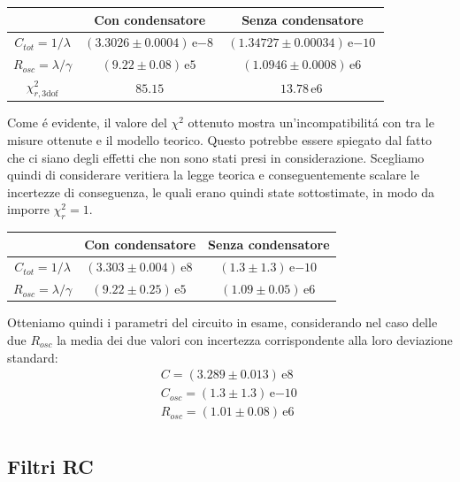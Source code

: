 \documentclass{article}
\newcommand{\E}[1]{\, \mathrm{e}{#1} \, }
\begin{document}
\begin{center}
\begin{tabular}{c | c c} 
& Con condensatore  & Senza condensatore \\
[0.5ex]
\hline
$C_{tot}=1/\lambda$ &$ (3.3026\pm 0.0004)\E{-8} $&$ (1.34727\pm 0.00034)\E{-10} $\\
$R_{osc}=\lambda/\gamma$ &$ (9.22\pm 0.08)\E{5} $&$ (1.0946\pm 0.0008)\E{6} $\\
$\chi^2_{r,\mathrm{3 dof}}$& $85.15$ & $13.78\E{6}$ \\

\end{tabular}
\end{center}

Come \'e evidente, il valore del $\chi^2$ ottenuto mostra un'incompatibilit\'a con tra le misure ottenute e il modello teorico. Questo potrebbe essere spiegato dal fatto che ci siano degli effetti che non sono stati presi in considerazione. Scegliamo quindi di considerare veritiera la legge teorica e conseguentemente scalare le incertezze di conseguenza, le quali erano quindi state sottostimate, in modo da imporre $\chi^2_r=1$.\\

\begin{center}
\begin{tabular}{c | c c} 
& Con condensatore  & Senza condensatore \\
[0.5ex]
\hline
$C_{tot}=1/\lambda$ &$ (3.303\pm 0.004)\E{8} $&$ (1.3\pm 1.3)\E{-10} $\\
$R_{osc}=\lambda/\gamma$ &$ (9.22\pm 0.25)\E{5} $&$ (1.09\pm 0.05)\E{6} $\\
\end{tabular}
\end{center}

Otteniamo quindi i parametri del circuito in esame, considerando nel caso delle due $R_{osc}$ la media dei due valori con incertezza corrispondente alla loro deviazione standard: \\

\begin{gather}
	\nonumber
	C=(3.289\pm 0.013)\E{8}\\
	\nonumber
	C_{osc}=(1.3\pm 1.3)\E{-10} \\
	\nonumber
	R_{osc}=(1.01\pm 0.08)\E{6} \\
\end{gather}

\newpage
\subsection{Filtri RC}
\end{document}
